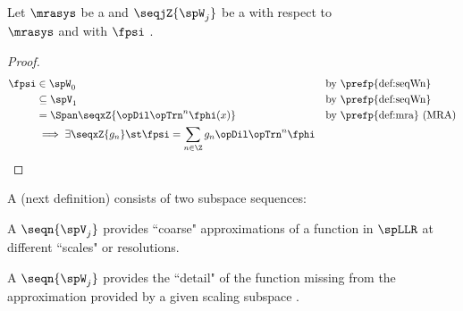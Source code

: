 \begin{theorem}
\label{thm:g->psi}
Let $\mrasys$ be a  
and $\seqjZ{\spW_j}$ be a   
with respect to\\
$\mrasys$ and with  $\fpsi$ .
\end{theorem}
\begin{proof}
\begin{align*}
  \fpsi &\in \spW_0
        && \text{by \prefp{def:seqWn}}
      \\&\subseteq \spV_1
        && \text{by \prefp{def:seqWn}}
      \\&= \Span\seqxZ{\opDil\opTrn^n\fphi(x)}
        && \text{by \prefp{def:mra} (MRA)}
      \\&\implies 
         \exists \seqxZ{g_n} \st
            \fpsi = \sum_{n\in\Z}  g_n \opDil \opTrn^n \fphi
\end{align*}

\end{proof}

A  (next definition) consists of two subspace sequences: 
\begin{liste}
  \item A  $\seqn{\spV_j}$ 
     provides ``coarse" approximations of a function in $\spLLR$ at different ``scales" or resolutions.
  \item A  $\seqn{\spW_j}$
     provides the ``detail" of the function missing from the approximation provided by a given scaling subspace
     .
\end{liste}

